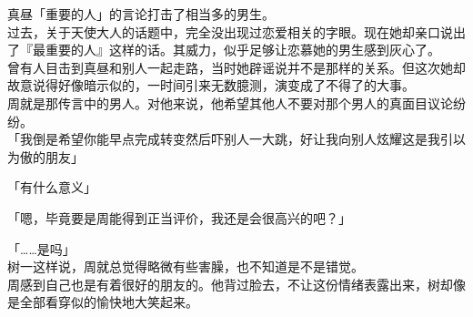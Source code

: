 真昼「重要的人」的言论打击了相当多的男生。\\

过去，关于天使大人的话题中，完全没出现过恋爱相关的字眼。现在她却亲口说出了『最重要的人』这样的话。其威力，似乎足够让恋慕她的男生感到灰心了。\\

曾有人目击到真昼和别人一起走路，当时她辟谣说并不是那样的关系。但这次她却故意说得好像暗示似的，一时间引来无数臆测，演变成了不得了的大事。\\

周就是那传言中的男人。对他来说，他希望其他人不要对那个男人的真面目议论纷纷。\\

「我倒是希望你能早点完成转变然后吓别人一大跳，好让我向别人炫耀这是我引以为傲的朋友」

「有什么意义」

「嗯，毕竟要是周能得到正当评价，我还是会很高兴的吧？」

「……是吗」\\

树一这样说，周就总觉得略微有些害臊，也不知道是不是错觉。\\

周感到自己也是有着很好的朋友的。他背过脸去，不让这份情绪表露出来，树却像是全部看穿似的愉快地大笑起来。
